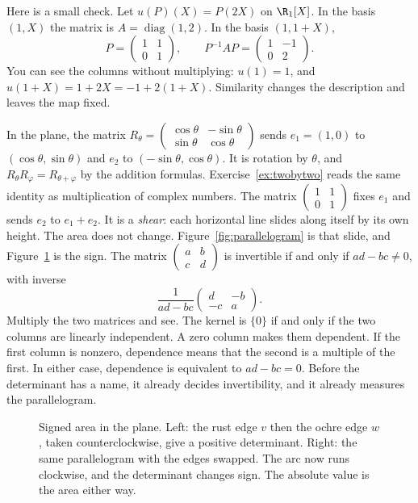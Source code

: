 Here is a small check. Let $u(P)(X)=P(2X)$ on $\R_1[X]$. In the basis $(1,X)$ the matrix is $A=\operatorname{diag}(1,2)$. In the basis $(1,1+X)$,
\[
P=\begin{pmatrix}1&1\\0&1\end{pmatrix},\qquad P^{-1}AP=\begin{pmatrix}1&-1\\0&2\end{pmatrix}.
\]
You can see the columns without multiplying: $u(1)=1$, and $u(1+X)=1+2X=-1+2(1+X)$. Similarity changes the description and leaves the map fixed.

\begin{examplex}
In the plane, the matrix $R_\theta=\begin{pmatrix}\cos\theta&-\sin\theta\\ \sin\theta&\cos\theta\end{pmatrix}$ sends $e_1=(1,0)$ to $(\cos\theta,\sin\theta)$ and $e_2$ to $(-\sin\theta,\cos\theta)$. It is rotation by $\theta$, and $R_\theta R_\varphi=R_{\theta+\varphi}$ by the addition formulas. Exercise~\ref{ex:twobytwo} reads the same identity as multiplication of complex numbers. The matrix $\begin{pmatrix}1&1\\0&1\end{pmatrix}$ fixes $e_1$ and sends $e_2$ to $e_1+e_2$. It is a \emph{shear}: each horizontal line slides along itself by its own height. The area does not change. Figure~\ref{fig:parallelogram} is that slide, and Figure~\ref{fig:orientation} is the sign. The matrix $\begin{pmatrix}a&b\\c&d\end{pmatrix}$ is invertible if and only if $ad-bc\ne0$, with inverse
\[
\frac1{ad-bc}\begin{pmatrix}d&-b\\-c&a\end{pmatrix}.
\]
Multiply the two matrices and see. The kernel is $\{0\}$ if and only if the two columns are linearly independent. A zero column makes them dependent. If the first column is nonzero, dependence means that the second is a multiple of the first. In either case, dependence is equivalent to $ad-bc=0$. Before the determinant has a name, it already decides invertibility, and it already measures the parallelogram.
\end{examplex}

\begin{figure}[ht]
\centering
{}
\caption{Signed area in the plane. Left: the rust edge $v$ then the ochre edge $w$, taken counterclockwise, give a positive determinant. Right: the same parallelogram with the edges swapped. The arc now runs clockwise, and the determinant changes sign. The absolute value is the area either way.}
\label{fig:orientation}
\end{figure}

